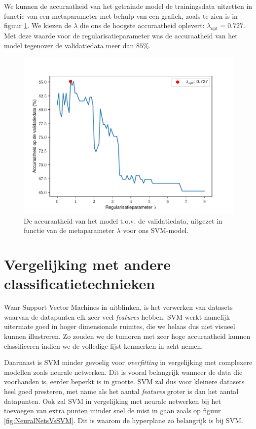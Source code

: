 \documentclass[twoside, kulak]{kulakreport}
\begin{document}
	We kunnen de accuraatheid van het getrainde model de trainingsdata uitzetten in functie van een metaparameter met behulp van een grafiek, zoals te zien is in figuur \ref{fig:metaparameter}. We kiezen de \(\lambda\) die ons de hoogste accuraatheid oplevert: \(\lambda_{\text{opt}}=0.727\). Met deze waarde voor de regularisatieparameter was de accuraatheid van het model tegenover de validatiedata meer dan \(85\%\).
	
	\begin{figure}
		\centering
		\includegraphics{accuraatheid}
		\caption{De accuraatheid van het model t.o.v. de validatiedata, uitgezet in functie van de metaparameter \(\lambda\) voor ons SVM-model.}
		\label{fig:metaparameter}
	\end{figure}
	
	\chapter{Vergelijking met andere classificatietechnieken}
	
	Waar Support Vector Machines in uitblinken, is het verwerken van datasets waarvan de datapunten elk zeer veel \textit{features} hebben. SVM werkt namelijk uitermate goed in hoger dimensionale ruimtes, die we helaas dus niet visueel kunnen illustreren. Zo zouden we de tumoren met zeer hoge accuraatheid kunnen classificeren indien we de volledige lijst kenmerken in acht nemen.
	
	Daarnaast is SVM minder gevoelig voor \textit{overfitting} in vergelijking met complexere modellen zoals neurale netwerken. Dit is vooral belangrijk wanneer de data die voorhanden is, eerder beperkt is in grootte. SVM zal dus voor kleinere datasets heel goed presteren, met name als het aantal \textit{features} groter is dan het aantal datapunten. Ook zal SVM in vergelijking met neurale netwerken bij het toevoegen van extra punten minder snel de mist in gaan zoals op figuur \ref{fig:NeuralNetsVsSVM}. Dit is waarom de hyperplane zo belangrijk is bij SVM. 
	
\end{document}
